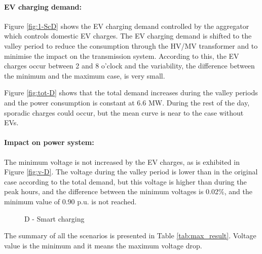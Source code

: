 \documentclass[a4paper,11pt,twoside,openright]{report}
\begin{document}
\paragraph{EV charging demand:}
Figure \ref{fig:1-ScD} shows the EV charging demand controlled by the aggregator which controls domestic EV charges. The EV charging demand is shifted to the valley period to reduce the consumption through the HV/MV transformer and to minimise the impact on the transmission system. According to this, the EV charges occur between 2 and 8 o'clock and the variability, the difference between the minimum and the maximum case, is very small.

Figure \ref{fig:tot-D} shows that the total demand increases during the valley periods and the power consumption is constant at 6.6 MW. During the rest of the day, sporadic charges could occur, but the mean curve is near to the case without EVs.

\paragraph{Impact on power system:}
The minimum voltage is not increased by the EV charges, as is exhibited in Figure \ref{fig:v-D}. The voltage during the valley period is lower than in the original case according to the total demand, but this voltage is higher than during the peak hours, and the difference between the minimum voltages is 0.02$\%$, and the minimum value of 0.90 p.u. is not reached.

\begin{figure}[htbp]
	\centering
	\caption{D - Smart charging}
\end{figure}

The summary of all the scenarios is presented in Table \ref{tab:max_result}. Voltage value is the minimum and it means the maximum voltage drop.
\end{document}
